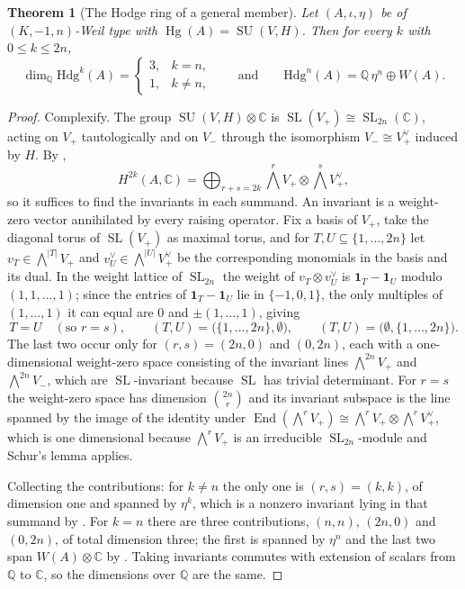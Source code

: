 \documentclass[11pt,reqno]{amsart}
\theoremstyle{plain}
\newtheorem{theorem}{Theorem}[section]
\theoremstyle{definition}
\theoremstyle{remark}
\newcommand{\QQ}{\mathbb{Q}}
\newcommand{\CC}{\mathbb{C}}
\newcommand{\Hdg}{\mathrm{Hdg}}
\newcommand{\HW}{W}                      %
\DeclareMathOperator{\End}{End}
\DeclareMathOperator{\Hg}{Hg}
\DeclareMathOperator{\SL}{SL}
\DeclareMathOperator{\SU}{SU}
\begin{document}
\begin{theorem}[The Hodge ring of a general member]\label{thm:hdgcount}
Let $(A,\iota,\eta)$ be of $(K,-1,n)$-Weil type with
$\Hg(A)=\SU(V,H)$. Then for every $k$ with $0\le k\le 2n$,
\[
  \dim_{\QQ}\Hdg^{k}(A)=
  \begin{cases}
    3, & k=n,\\[2pt]
    1, & k\ne n,
  \end{cases}
  \qquad\text{and}\qquad
  \Hdg^{n}(A)=\QQ\,\eta^{n}\oplus\HW(A).
\]
\end{theorem}

\begin{proof}
Complexify. The group $\SU(V,H)\otimes\CC$ is $\SL(V_{+})\cong\SL_{2n}(\CC)$,
acting on $V_{+}$ tautologically and on $V_{-}$ through the isomorphism
$V_{-}\cong V_{+}^{\vee}$ induced by $H$. By ,
\[
  H^{2k}(A,\CC)=\bigoplus_{r+s=2k}
    \textstyle\bigwedge^{r}V_{+}\otimes\bigwedge^{s}V_{+}^{\vee},
\]
so it suffices to find the invariants in each summand. An invariant is a
weight-zero vector annihilated by every raising operator. Fix a basis of
$V_{+}$, take the diagonal torus of $\SL(V_{+})$ as maximal torus, and for
$T,U\subseteq\{1,\dots,2n\}$ let $v_{T}\in\bigwedge^{|T|}V_{+}$ and
$v_{U}^{\vee}\in\bigwedge^{|U|}V_{+}^{\vee}$ be the corresponding monomials in
the basis and its dual. In the weight lattice of $\SL_{2n}$ the weight of
$v_{T}\otimes v_{U}^{\vee}$ is
$\mathbf{1}_{T}-\mathbf{1}_{U}$ modulo $(1,1,\dots,1)$; since the entries of
$\mathbf{1}_{T}-\mathbf{1}_{U}$ lie in $\{-1,0,1\}$, the only multiples of
$(1,\dots,1)$ it can equal are $0$ and $\pm(1,\dots,1)$, giving
\[
  T=U \quad(\text{so } r=s),
  \qquad
  (T,U)=\bigl(\{1,\dots,2n\},\emptyset\bigr),
  \qquad
  (T,U)=\bigl(\emptyset,\{1,\dots,2n\}\bigr).
\]
The last two occur only for $(r,s)=(2n,0)$ and $(0,2n)$, each with a
one-dimensional weight-zero space consisting of the invariant lines
$\bigwedge^{2n}V_{+}$ and $\bigwedge^{2n}V_{-}$, which are $\SL$-invariant
because $\SL$ has trivial determinant. For $r=s$ the weight-zero space has
dimension $\binom{2n}{r}$ and its invariant subspace is the line spanned by the
image of the identity under
$\End(\bigwedge^{r}V_{+})\cong\bigwedge^{r}V_{+}\otimes\bigwedge^{r}V_{+}^{\vee}$,
which is one dimensional because $\bigwedge^{r}V_{+}$ is an irreducible
$\SL_{2n}$-module and Schur's lemma applies.

Collecting the contributions: for $k\ne n$ the only one is $(r,s)=(k,k)$, of
dimension one and spanned by $\eta^{k}$, which is a nonzero invariant lying in
that summand by . For $k=n$ there are three contributions,
$(n,n)$, $(2n,0)$ and $(0,2n)$, of total dimension three; the first is spanned
by $\eta^{n}$ and the last two span $\HW(A)\otimes\CC$ by .
Taking invariants commutes with extension of scalars from $\QQ$ to $\CC$, so
the dimensions over $\QQ$ are the same.
\end{proof}
\end{document}
